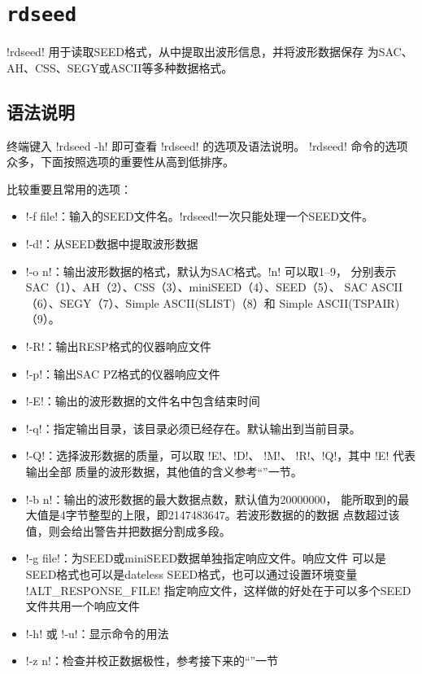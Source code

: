 \section{\texttt{rdseed}}
\label{sec:rdseed}

!rdseed! 用于读取SEED格式，从中提取出波形信息，并将波形数据保存
为SAC、AH、CSS、SEGY或ASCII等多种数据格式。

\subsection{语法说明}
终端键入 !rdseed -h! 即可查看 !rdseed! 的选项及语法说明。
!rdseed! 命令的选项众多，下面按照选项的重要性从高到低排序。

比较重要且常用的选项：
\begin{itemize}
\item !-f file!：输入的SEED文件名。!rdseed!一次只能处理一个SEED文件。
\item !-d!：从SEED数据中提取波形数据
\item !-o n!：输出波形数据的格式，默认为SAC格式。!n! 可以取1--9，
    分别表示SAC（1）、AH（2）、CSS（3）、miniSEED（4）、SEED（5）、
    SAC ASCII（6）、SEGY（7）、Simple ASCII(SLIST)（8）和
    Simple ASCII(TSPAIR)（9）。
\item !-R!：输出RESP格式的仪器响应文件
\item !-p!：输出SAC PZ格式的仪器响应文件
\item !-E!：输出的波形数据的文件名中包含结束时间
\item !-q!：指定输出目录，该目录必须已经存在。默认输出到当前目录。
\item !-Q!：选择波形数据的质量，可以取 !E!、!D!、
    !M!、 !R!、!Q!，其中 !E! 代表输出全部
    质量的波形数据，其他值的含义参考``''一节。
\item !-b n!：输出的波形数据的最大数据点数，默认值为20000000，
    能所取到的最大值是4字节整型的上限，即2147483647。若波形数据的的数据
    点数超过该值，则会给出警告并把数据分割成多段。
\item !-g file!：为SEED或miniSEED数据单独指定响应文件。响应文件
    可以是SEED格式也可以是dateless SEED格式，也可以通过设置环境变量
    !ALT_RESPONSE_FILE! 指定响应文件，这样做的好处在于可以多个SEED
    文件共用一个响应文件
\item !-h! 或 !-u!：显示命令的用法
\item !-z n!：检查并校正数据极性，参考接下来的``''一节
\end{itemize}

